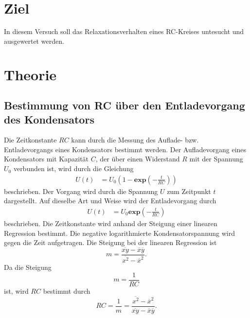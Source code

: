 
\section{Ziel}
In diesem Versuch soll das Relaxationsverhalten eines RC-Kreises untesucht und ausgewertet werden. 

\section{Theorie}
\cite{V353}
\label{sec:Theorie}
\subsection{Bestimmung von RC über den Entladevorgang des Kondensators}
Die Zeitkonstante $RC$ kann durch die Messung des Auflade- bzw. Entladevorgangs eines Kondensators bestimmt werden.
Der Aufladevorgang eines Kondensators mit Kapazität $C$, der über einen Widerstand $R$ mit der Spannung $U_{0}$ verbunden ist, wird durch die Gleichung
\begin{align*}
     U(t)&= U_{0} (1-\mathbf{exp}(-\frac{t}{RC}))
\end{align*}
beschrieben. Der Vorgang wird durch die Spannung $U$ zum Zeitpunkt $t$ dargestellt. 
Auf dieselbe Art und Weise wird der Entladevorgang durch
\begin{align*}
     U(t)&= U_{0} \mathbf{exp}(-\frac{t}{RC})
\end{align*}
beschrieben.
Die Zeitkonstante wird anhand der Steigung einer linearen Regression bestimmt.
Die negative logarithmierte Kondensatorspannung wird gegen die Zeit aufgetragen.
Die Steigung bei der linearen Regression ist
\begin{equation}
    m = \frac{\overline{xy} - \overline{x}\overline{y}}{\overline{x^2} - \overline{x}^2}.
    \label{eqn: m}
\end{equation}
Da die Steigung
\begin{equation*}
    m = \frac{1}{RC}
\end{equation*}
ist, wird $RC$ bestimmt durch
\begin{equation}
    RC= \frac{1}{m} = \frac{\overline{x^2} - \overline{x}^2}{\overline{xy} - \overline{x} \overline{y}}.
    \label{eqn: RC}
\end{equation}

